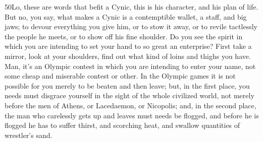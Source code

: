 50Lo, these are words that befit a Cynic, this is his character, and his plan of life. But no, you say, what makes a Cynic is a contemptible wallet, a staff, and big jaws; to devour everything you give him, or to stow it away, or to revile tactlessly the people he meets, or to show off his fine shoulder. Do you see the spirit in which you are intending to set your hand to so great an enterprise? First take a mirror, look at your shoulders, find out what kind of loins and thighs you have. Man, it's an Olympic contest in which you are intending to enter your name, not some cheap and miserable contest or other. In the Olympic games it is not possible for you merely to be beaten and then leave; but, in the first place, you needs must disgrace yourself in the sight of the whole civilized world, not merely before the men of Athens, or Lacedaemon, or Nicopolis; and, in the second place, the man who carelessly gets up and leaves must needs be flogged, and before he is flogged he has to suffer thirst, and scorching heat, and swallow quantities of wrestler's sand.

